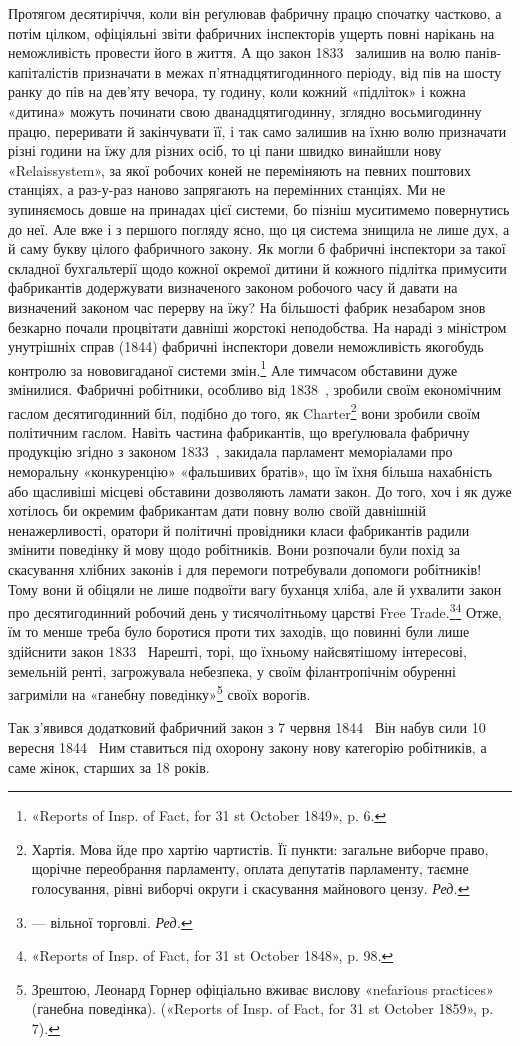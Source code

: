 Протягом десятиріччя, коли він реґулював фабричну працю
спочатку частково, а потім цілком, офіціяльні звіти фабричних
інспекторів ущерть повні нарікань на неможливість провести його
в життя. А що закон 1833~ залишив на волю панів-капіталістів
призначати в межах п’ятнадцятигодинного періоду, від пів на шосту
ранку до пів на дев’яту вечора, ту годину, коли кожний «підліток»
і кожна «дитина» можуть починати свою дванадцятигодинну,
зглядно восьмигодинну працю, переривати й закінчувати
її, і так само залишив на їхню волю призначати різні години
на їжу для різних осіб, то ці пани швидко винайшли нову
«Relaissystem», за якої робочих коней не переміняють на певних
поштових станціях, а раз-у-раз наново запрягають на перемінних
станціях. Ми не зупиняємось довше на принадах цієї
системи, бо пізніш муситимемо повернутись до неї. Але вже і з
першого погляду ясно, що ця система знищила не лише дух, а й
саму букву цілого фабричного закону. Як могли б фабричні
інспектори за такої складної бухгальтерії щодо кожної окремої
дитини й кожного підлітка примусити фабрикантів додержувати
визначеного законом робочого часу й давати на визначений законом
час перерву на їжу? На більшості фабрик незабаром знов
безкарно почали процвітати давніші жорстокі неподобства.
На нараді з міністром унутрішніх справ (1844) фабричні інспектори
довели неможливість якогобудь контролю за нововигаданої
системи змін.\footnote{
«Reports of Insp. of Fact, for 31 st October 1849», p. 6.
} Але тимчасом обставини дуже змінилися. Фабричні
робітники, особливо від 1838~, зробили своїм економічним гаслом
десятигодинний біл, подібно до того, як Charter\footnote*{
Хартія. Мова йде про хартію чартистів. Її пункти: загальне виборче
право, щорічне переобрання парламенту, оплата депутатів парламенту,
таємне голосування, рівні виборчі округи і скасування майнового
цензу. \emph{Ред.}
} вони зробили своїм
політичним гаслом. Навіть частина фабрикантів, що вреґулювала
фабричну продукцію згідно з законом 1833~, закидала парламент
меморіалами про неморальну «конкуренцію» «фальшивих братів»,
що їм їхня більша нахабність або щасливіші місцеві обставини
дозволяють ламати закон. До того, хоч і як дуже хотілось би
окремим фабрикантам дати повну волю своїй давнішній ненажерливості,
оратори й політичні провідники класи фабрикантів радили
змінити поведінку й мову щодо робітників. Вони розпочали
були похід за скасування хлібних законів і для перемоги потребували
допомоги робітників! Тому вони й обіцяли не лише подвоїти
вагу буханця хліба, але й ухвалити закон про десятигодинний
робочий день у тисячолітньому царстві Free Trade.\footnote*{
— вільної торговлі. \emph{Ред.}
}\footnote{
«Reports of Insp. of Fact, for 31 st October 1848», p. 98.
} Отже, їм то менше треба було боротися проти тих заходів, що
повинні були лише здійснити закон 1833~ Нарешті, торі, що їхньому
найсвятішому інтересові, земельній ренті, загрожувала
небезпека, у своїм філантропічнім обуренні загриміли на «ганебну
поведінку»\footnote{
Зрештою, Леонард Горнер офіціально вживає вислову «nefarious
practices» (ганебна поведінка). («Reports of Insp. of Fact, for 31 st
October 1859», p. 7).
} своїх ворогів.

Так з’явився додатковий фабричний закон з 7 червня 1844~
Він набув сили 10 вересня 1844~ Ним ставиться під охорону закону
нову категорію робітників, а саме жінок, старших за 18 років.
\parbreak{}  %
